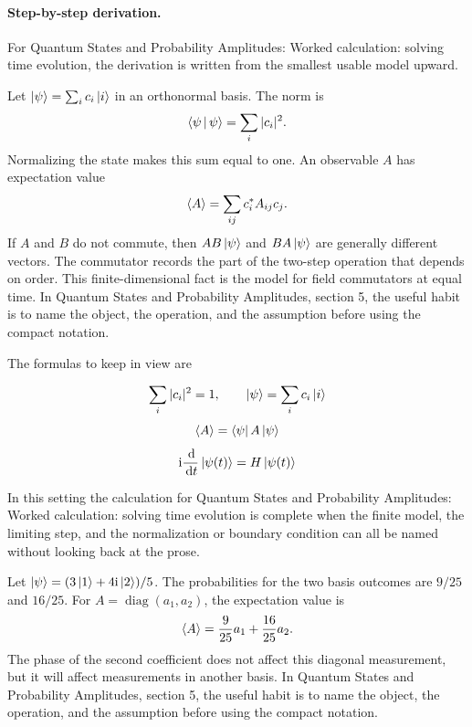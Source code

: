 \paragraph{Step-by-step derivation.}

For Quantum States and Probability Amplitudes: Worked calculation: solving time evolution, the derivation is written from the smallest usable model upward.

Let \(\left|\psi\right\rangle=\sum_i c_i\left|i\right\rangle\) in an orthonormal basis.  The norm is
\[
  \left\langle \psi\,\middle|\,\psi\right\rangle=\sum_i |c_i|^2.
\]
Normalizing the state makes this sum equal to one.  An observable \(A\) has expectation value
\[
  \left\langle A\right\rangle=\sum_{ij}c_i^*A_{ij}c_j.
\]
If \(A\) and \(B\) do not commute, then \(AB\left|\psi\right\rangle\) and \(BA\left|\psi\right\rangle\) are generally different vectors.  The commutator records the part of the two-step operation that depends on order.  This finite-dimensional fact is the model for field commutators at equal time.  In Quantum States and Probability Amplitudes, section 5, the useful habit is to name the object, the operation, and the assumption before using the compact notation.

The formulas to keep in view are

\[
  \sum_i |c_i|^2=1,\qquad \left|\psi\right\rangle=\sum_i c_i\left|i\right\rangle
\]
\[
  \left\langle A\right\rangle=\left\langle \psi\right|A\left|\psi\right\rangle
\]
\[
  \mathrm i\frac{\,\mathrm d}{\,\mathrm d t}\left|\psi(t)\right\rangle=H\left|\psi(t)\right\rangle
\]

In this setting the calculation for Quantum States and Probability Amplitudes: Worked calculation: solving time evolution is complete when the finite model, the limiting step, and the normalization or boundary condition can all be named without looking back at the prose.




\begin{example}
Let \(\left|\psi\right\rangle=(3\left|1\right\rangle+4\mathrm i\left|2\right\rangle)/5\).  The probabilities for the two basis outcomes are \(9/25\) and \(16/25\).  For \(A=\operatorname{diag}(a_1,a_2)\), the expectation value is
\[
  \left\langle A\right\rangle=\frac{9}{25}a_1+\frac{16}{25}a_2.
\]
The phase of the second coefficient does not affect this diagonal measurement, but it will affect measurements in another basis.  In Quantum States and Probability Amplitudes, section 5, the useful habit is to name the object, the operation, and the assumption before using the compact notation.
\end{example}



